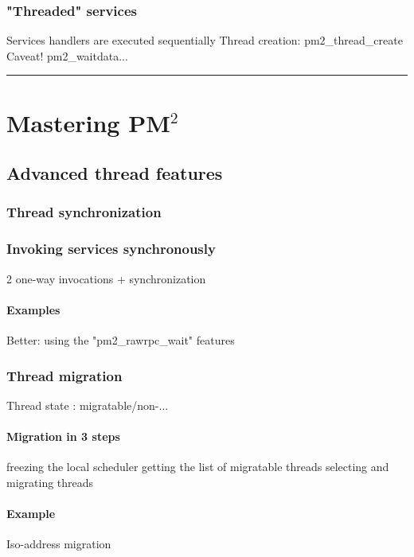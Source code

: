 \documentclass[a4paper,11pt]{report}
\def\pm2{PM$^2$\xspace}
\def\endchap{\vspace{2cm}\begin{center}\rule{6cm}{1mm}\end{center}}
\begin{document}
\subsection{"Threaded" services}
        Services handlers are executed sequentially
        Thread creation: pm2\_thread\_create
        Caveat! pm2\_waitdata...
\endchap

\chapter{Mastering \pm2}

\section{Advanced thread features}

\subsection{Thread synchronization}

\subsection{Invoking services synchronously}
        2 one-way invocations + synchronization

\subsubsection{Examples}
        Better: using the "pm2\_rawrpc\_wait" features

\subsection{Thread migration}
        Thread state : migratable/non-...

\subsubsection{Migration in 3 steps}
        freezing the local scheduler
        getting the list of migratable threads
        selecting and migrating threads

\subsubsection{Example}
        Iso-address migration
\end{document}
